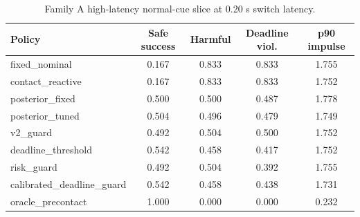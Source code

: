 \begin{table}[t]
\centering
\small
\caption{Family A high-latency normal-cue slice at 0.20 s switch latency.}
\label{tab:high-latency}
\begin{tabular}{lcccc}
\toprule
Policy & Safe success & Harmful & Deadline viol. & p90 impulse \\
\midrule
fixed\_nominal & 0.167 & 0.833 & 0.833 & 1.755 \\
contact\_reactive & 0.167 & 0.833 & 0.833 & 1.752 \\
posterior\_fixed & 0.500 & 0.500 & 0.487 & 1.778 \\
posterior\_tuned & 0.504 & 0.496 & 0.479 & 1.749 \\
v2\_guard & 0.492 & 0.504 & 0.500 & 1.752 \\
deadline\_threshold & 0.542 & 0.458 & 0.417 & 1.752 \\
risk\_guard & 0.492 & 0.504 & 0.392 & 1.755 \\
calibrated\_deadline\_guard & 0.542 & 0.458 & 0.438 & 1.731 \\
oracle\_precontact & 1.000 & 0.000 & 0.000 & 0.232 \\
\bottomrule
\end{tabular}
\end{table}
